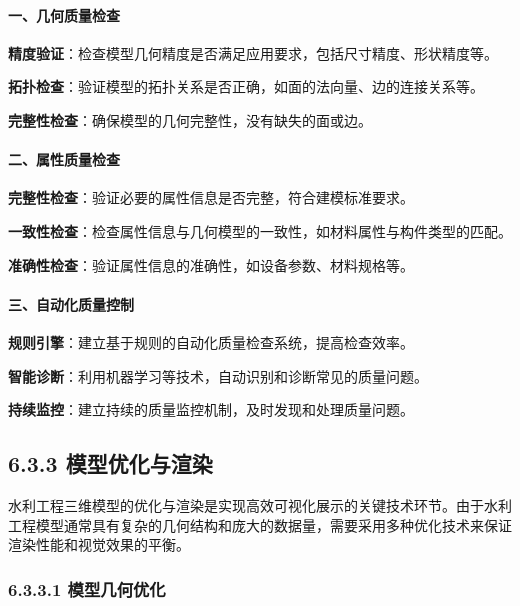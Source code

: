 \paragraph{一、几何质量检查}\label{ux4e00ux51e0ux4f55ux8d28ux91cfux68c0ux67e5}

\textbf{精度验证}：检查模型几何精度是否满足应用要求，包括尺寸精度、形状精度等。

\textbf{拓扑检查}：验证模型的拓扑关系是否正确，如面的法向量、边的连接关系等。

\textbf{完整性检查}：确保模型的几何完整性，没有缺失的面或边。

\paragraph{二、属性质量检查}\label{ux4e8cux5c5eux6027ux8d28ux91cfux68c0ux67e5}

\textbf{完整性检查}：验证必要的属性信息是否完整，符合建模标准要求。

\textbf{一致性检查}：检查属性信息与几何模型的一致性，如材料属性与构件类型的匹配。

\textbf{准确性检查}：验证属性信息的准确性，如设备参数、材料规格等。

\paragraph{三、自动化质量控制}\label{ux4e09ux81eaux52a8ux5316ux8d28ux91cfux63a7ux5236}

\textbf{规则引擎}：建立基于规则的自动化质量检查系统，提高检查效率。

\textbf{智能诊断}：利用机器学习等技术，自动识别和诊断常见的质量问题。

\textbf{持续监控}：建立持续的质量监控机制，及时发现和处理质量问题。

\subsection{6.3.3
模型优化与渲染}\label{ux6a21ux578bux4f18ux5316ux4e0eux6e32ux67d3}

水利工程三维模型的优化与渲染是实现高效可视化展示的关键技术环节。由于水利工程模型通常具有复杂的几何结构和庞大的数据量，需要采用多种优化技术来保证渲染性能和视觉效果的平衡。

\subsubsection{6.3.3.1
模型几何优化}\label{ux6a21ux578bux51e0ux4f55ux4f18ux5316}

